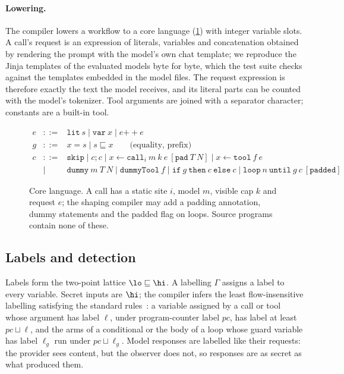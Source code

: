 \paragraph{Lowering.} The compiler lowers a workflow to a core language (\cref{fig:core}) with integer variable slots. A call's request is an expression of literals, variables and concatenation obtained by rendering the prompt with the model's own chat template; we reproduce the Jinja templates of the evaluated models byte for byte, which the test suite checks against the templates embedded in the model files. The request expression is therefore exactly the text the model receives, and its literal parts can be counted with the model's tokenizer. Tool arguments are joined with a separator character; constants are a built-in tool.

\begin{figure}[t]
\small
\[
\begin{array}{rcl}
e &::=& \texttt{lit}\ s \mid \texttt{var}\ x \mid e \mathbin{+\!\!+} e \\
g &::=& x = s \mid s \sqsubseteq x \qquad\text{(equality, prefix)}\\
c &::=& \texttt{skip} \mid c ; c \mid x \leftarrow \texttt{call}_i\ m\ k\ e\ [\texttt{pad}\ T\ N] \mid x \leftarrow \texttt{tool}\ f\ e \\
  &\mid& \texttt{dummy}\ m\ T\ N \mid \texttt{dummyTool}\ f \mid \texttt{if}\ g\ \texttt{then}\ c\ \texttt{else}\ c \mid \texttt{loop}\ n\ \texttt{until}\ g\ c\ [\texttt{padded}]
\end{array}
\]
\caption{Core language. A call has a static site $i$, model $m$, visible cap $k$ and request $e$; the shaping compiler may add a padding annotation, dummy statements and the padded flag on loops. Source programs contain none of these.}
\label{fig:core}
\end{figure}

\subsection{Labels and detection}\label{sec:labels}

Labels form the two-point lattice $\lo \sqsubseteq \hi$. A labelling $\Gamma$ assigns a label to every variable. Secret inputs are $\hi$; the compiler infers the least flow-insensitive labelling satisfying the standard rules~\cite{volpano1996sound}: a variable assigned by a call or tool whose argument has label $\ell$, under program-counter label $\mathit{pc}$, has label at least $\mathit{pc} \sqcup \ell$, and the arms of a conditional or the body of a loop whose guard variable has label $\ell_g$ run under $\mathit{pc} \sqcup \ell_g$. Model responses are labelled like their requests: the provider sees content, but the observer does not, so responses are as secret as what produced them.

